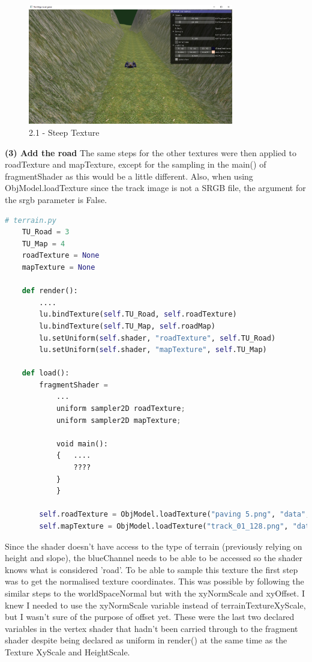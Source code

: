 \documentclass[a4 paper, 12pt]{article}
\begin{document}
    \begin{figure} [H]
        \centering
        \includegraphics[width=0.8\textwidth, frame]
            {./images/2.1_b.PNG}
        \caption{2.1 - Steep Texture}   
    \end{figure}




\textbf{(3) Add the road}
The same steps for the other textures were then applied to roadTexture and mapTexture, except for the sampling in the main() of fragmentShader as this would be a little different. Also, when using ObjModel.loadTexture since the track image is not a SRGB file, the argument for the srgb parameter is False. 
\begin{lstlisting}[language=python]
    # terrain.py
    TU_Road = 3
    TU_Map = 4
    roadTexture = None
    mapTexture = None

    def render():
        ....
        lu.bindTexture(self.TU_Road, self.roadTexture)
        lu.bindTexture(self.TU_Map, self.roadMap)
        lu.setUniform(self.shader, "roadTexture", self.TU_Road)
        lu.setUniform(self.shader, "mapTexture", self.TU_Map)

    def load():
        fragmentShader = 
            ...
            uniform sampler2D roadTexture;
            uniform sampler2D mapTexture;

            void main():
            {   ....
                ????
            }
            }
        
        self.roadTexture = ObjModel.loadTexture("paving 5.png", "data", True)
        self.mapTexture = ObjModel.loadTexture("track_01_128.png", "data", False)
\end{lstlisting}


Since the shader doesn't have access to the type of terrain (previously relying on height and slope), the blueChannel needs to be able to be accessed so the shader knows what is considered 'road'. To be able to sample this texture the first step was to get the normalised texture coordinates. This was possible by following the similar steps to the worldSpaceNormal but with the xyNormScale and xyOffset. I knew I needed to use the xyNormScale variable instead of terrainTextureXyScale, but I wasn't sure of the purpose of offset yet. These were the last two declared variables in the vertex shader that hadn't been carried through to the fragment shader despite being declared as uniform in render() at the same time as the Texture XyScale and HeightScale.
\end{document}
